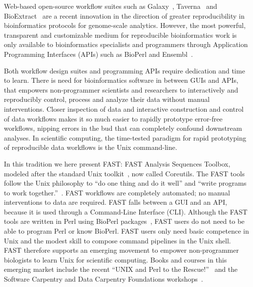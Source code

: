 \documentclass{frontiersSCNS} %
\begin{document}
Web-based open-source workflow suites such as Galaxy~\citep{galaxy14},
Taverna~\citep{CPE:CPE993} and BioExtract~\citep{Lushbough01072011}
are a recent innovation in the direction of greater reproducibility in
bioinformatics protocols for genome-scale analytics. However, the most
powerful, transparent and customizable medium for reproducible
bioinformatics work is only available to bioinformatics specialists
and programmers through Application Programming Interfaces (APIs) such
as BioPerl and Ensembl~\citep{Yates01012015}. 

Both workflow design suites and programming APIs require dedication
and time to learn.  There is need for bioinformatics software in
between GUIs and APIs, that empowers non-programmer scientists and
researchers to interactively and reproducibly control, process and
analyze their data without manual interventions. Closer inspection of
data and interactive construction and control of data workflows makes
it so much easier to rapidly prototype error-free workflows, nipping
errors in the bud that can completely confound downstream analyses.
In scientific computing, the time-tested paradigm for rapid
prototyping of reproducible data workflows is the Unix command-line.

In this tradition we here present FAST: FAST Analysis Sequences
Toolbox, modeled after the standard Unix toolkit~\citep{Peek2001}, now
called Coreutils.  The FAST tools follow the Unix philosophy to ``do
one thing and do it well'' and ``write programs to work
together.''~\citep{Stutz2000}. FAST workflows are completely
automated; no manual interventions to data are required.  FAST falls
between a GUI and an API, because it is used through a Command-Line
Interface (CLI).  Although the FAST tools are written in Perl using
BioPerl packages~\citep{Stajich2002}, FAST users do not need to be
able to program Perl or know BioPerl. FAST users only need basic
competence in Unix and the modest skill to compose command pipelines
in the Unix shell.  FAST therefore supports an emerging movement to
empower non-programmer biologists to learn Unix for scientific
computing. Books and courses in this emerging market include the
recent ``UNIX and Perl to the Rescue!''~\citep{bradnam2012unix} and
the Software Carpentry and Data Carpentry Foundations
workshops~\citep{wilson_software_2014}.
\end{document}
